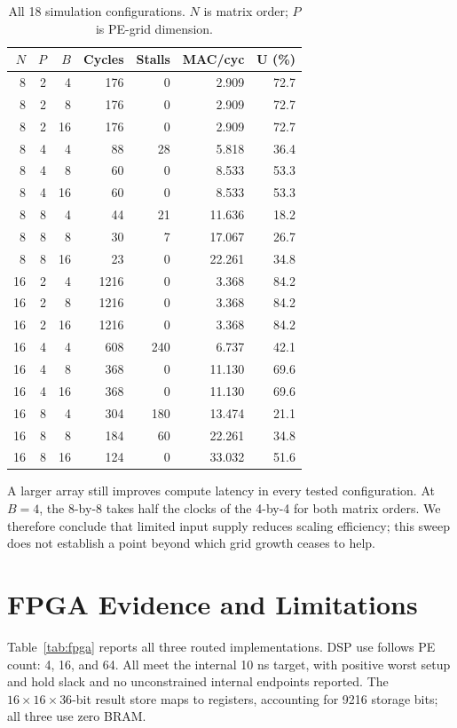 \documentclass[conference]{IEEEtran}
\begin{document}
\begin{table}[t]
\centering
\caption{All 18 simulation configurations. $N$ is matrix order; $P$ is PE-grid dimension.}
\begin{tabular}{rrrrrrr}
\toprule
$N$ & $P$ & $B$ & Cycles & Stalls & MAC/cyc & U (\%)\\
\midrule
8 & 2 & 4 & 176 & 0 & 2.909 & 72.7\\
8 & 2 & 8 & 176 & 0 & 2.909 & 72.7\\
8 & 2 & 16 & 176 & 0 & 2.909 & 72.7\\
8 & 4 & 4 & 88 & 28 & 5.818 & 36.4\\
8 & 4 & 8 & 60 & 0 & 8.533 & 53.3\\
8 & 4 & 16 & 60 & 0 & 8.533 & 53.3\\
8 & 8 & 4 & 44 & 21 & 11.636 & 18.2\\
8 & 8 & 8 & 30 & 7 & 17.067 & 26.7\\
8 & 8 & 16 & 23 & 0 & 22.261 & 34.8\\
\midrule
16 & 2 & 4 & 1216 & 0 & 3.368 & 84.2\\
16 & 2 & 8 & 1216 & 0 & 3.368 & 84.2\\
16 & 2 & 16 & 1216 & 0 & 3.368 & 84.2\\
16 & 4 & 4 & 608 & 240 & 6.737 & 42.1\\
16 & 4 & 8 & 368 & 0 & 11.130 & 69.6\\
16 & 4 & 16 & 368 & 0 & 11.130 & 69.6\\
16 & 8 & 4 & 304 & 180 & 13.474 & 21.1\\
16 & 8 & 8 & 184 & 60 & 22.261 & 34.8\\
16 & 8 & 16 & 124 & 0 & 33.032 & 51.6\\
\bottomrule
\end{tabular}
\end{table}

A larger array still improves compute latency in every tested configuration. At $B=4$, the 8-by-8 takes half the clocks of the 4-by-4 for both matrix orders. We therefore conclude that limited input supply reduces scaling efficiency; this sweep does not establish a point beyond which grid growth ceases to help.

\section{FPGA Evidence and Limitations}
Table~\ref{tab:fpga} reports all three routed implementations. DSP use follows PE count: 4, 16, and 64. All meet the internal 10 ns target, with positive worst setup and hold slack and no unconstrained internal endpoints reported. The $16\times16\times36$-bit result store maps to registers, accounting for 9216 storage bits; all three use zero BRAM.
\end{document}
